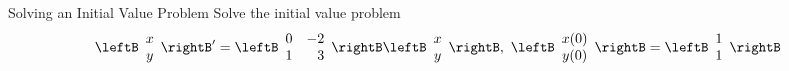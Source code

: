 \begin{example}{Solving an Initial Value Problem}
Solve the initial value problem
\begin{equation*}
\leftB
\begin{array}{c}
x \\
y
\end{array}
\rightB ^{\prime }=\leftB 
\begin{array}{rr}
0 & -2 \\
1 & 3
\end{array}
\rightB \leftB
\begin{array}{c}
x \\
y
\end{array}
\rightB ,\ \leftB
\begin{array}{c}
x(0)\\
y(0)
\end{array}
\rightB  =\leftB
\begin{array}{c}
1 \\
1
\end{array}
\rightB
\end{equation*}
\end{example}

